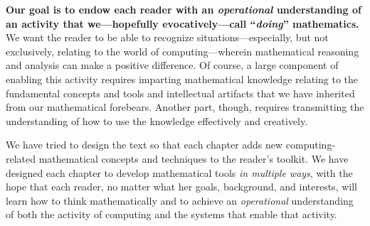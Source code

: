 \bigskip

{\bf Our goal is to endow each reader with an {\em operational} understanding of an activity that we---hopefully evocatively---call ``{\em doing}'' mathematics.}  We want the reader to be able to recognize situations---especially, but not exclusively, relating to the world of computing---wherein mathematical reasoning and analysis can make a positive difference.  Of course, a large component of enabling this activity requires imparting  mathematical knowledge relating to the fundamental concepts and tools and intellectual artifacts that we have inherited from our mathematical forebears.  Another part, though, requires transmitting the understanding of how to use the knowledge effectively and creatively.

\smallskip

We have tried to design the text so that each chapter adds new computing-related mathematical concepts and techniques to the reader's toolkit.  We have designed each chapter to develop mathematical tools {\em in multiple ways}, with the hope that each reader, no matter what her goals, background, and interests, will learn how to think mathematically and to achieve an {\em operational} understanding of both the activity of computing and the systems that enable that activity.

\smallskip

